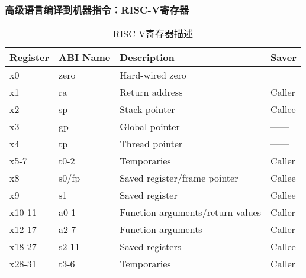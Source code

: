 \begin{frame}[plain]
	
	\frametitle{高级语言编译到机器指令：\small{RISC-V寄存器}}
	\begin{table}[h]
		\caption{RISC-V寄存器描述}\small
		\begin{tabular}{|l|l|l|l|}
			\hline
			Register & ABI Name & Description                      & Saver  \\\hline
			x0       & zero     & Hard-wired zero                  & ------ \\\hline
			x1       & ra       & Return address                   & Caller \\\hline
			x2       & sp       & Stack pointer                    & Callee \\\hline
			x3       & gp       & Global pointer                   & ------ \\\hline
			x4       & tp       & Thread pointer                   & ------ \\\hline
			x5-7     & t0-2     & Temporaries                      & Caller \\\hline
			x8       & s0/fp    & Saved register/frame pointer     & Callee \\\hline
			x9       & s1       & Saved register                   & Callee \\\hline
			x10-11   & a0-1     & Function arguments/return values & Caller \\\hline
			x12-17   & a2-7     & Function arguments               & Caller \\\hline
			x18-27   & s2-11    & Saved registers                  & Callee \\\hline
			x28-31   & t3-6     & Temporaries                      & Caller \\
			\hline
		\end{tabular}
	\end{table}
	
\end{frame}


